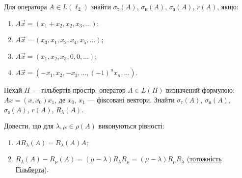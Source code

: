 \begin{exercise}
    Для оператора $A \in L(\ell_2)$ знайти 
    $\sigma_\text{т}(A)$, $\sigma_\text{н}(A)$, $\sigma_\text{з}(A)$, $r(A)$, якщо:
    \begin{enumerate}
        \item $A\vec{x} = (x_1 + x_2, x_2, x_3, ...)$;
        \item $A\vec{x} = (x_3 , x_1, x_2, x_4, x_5, ...)$;
        \item $A\vec{x} = (x_1 , x_2, x_3, 0, 0, ...)$;
        \item $A\vec{x} = (-x_1, x_2, -x_3, ..., (-1)^n x_n, ...)$.
    \end{enumerate}
\end{exercise}

\begin{exercise}\label{N:1_7_9}
    Нехай $H$ --- гільбертів простір. оператор $A \in L(H)$ визначений формулою: 
    $Ax = (x, x_0)x_1$, де $x_0$, $x_1$ --- фіксовані вектори. Знайти
    $\sigma_\text{т}(A)$, $\sigma_\text{н}(A)$, $\sigma_\text{з}(A)$, $r(A)$, $R_\lambda(A)$.
\end{exercise}

\begin{exercise}
    Довести, що для $\lambda, \mu \in \rho(A)$ виконуються рівності: 
    \begin{enumerate}
        \item $AR_\lambda(A) = R_\lambda(A)A$;
        \item $R_\lambda(A) - R_\mu(A) = (\mu - \lambda)R_\lambda R_\mu = (\mu - \lambda) 
        R_\mu R_\lambda$ (\ul{тотожність Гільберта}).
    \end{enumerate}
\end{exercise}